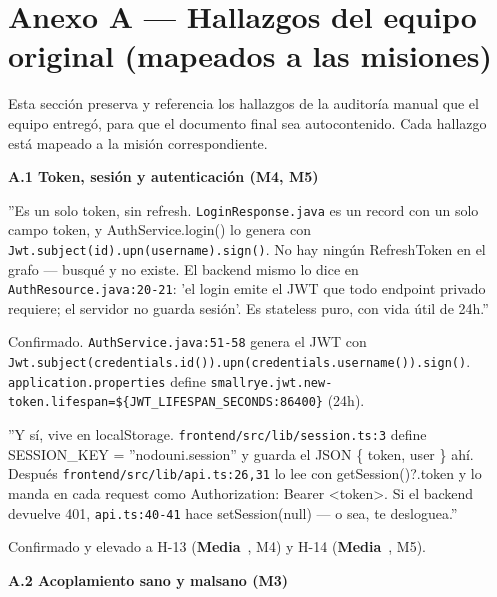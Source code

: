 \documentclass[10pt,a4paper]{article}
\newcommand{\code}[1]{\nolinkurl{#1}}
\newcommand{\badgeMedia}{\colorbox{yellow!35}{\textcolor{brown!90!black}{\textbf{\footnotesize Media}}}}
\begin{document}
\section*{Anexo A --- Hallazgos del equipo original (mapeados a las misiones)}
Esta sección preserva y referencia los hallazgos de la auditoría manual que el equipo entregó, para que el documento final sea autocontenido. Cada hallazgo está mapeado a la misión correspondiente.\par\vspace{0.4em}
\vspace{0.6em}\noindent\textbf{\normalsize A.1 Token, sesión y autenticación (M4, M5)}\par\vspace{0.2em}
''Es un solo token, sin refresh. \code{LoginResponse.java} es un record con un solo campo token, y AuthService.login() lo genera con \code{Jwt.subject(id).upn(username).sign()}. No hay ningún RefreshToken en el grafo --- busqué y no existe. El backend mismo lo dice en \code{AuthResource.java:20-21}: 'el login emite el JWT que todo endpoint privado requiere; el servidor no guarda sesión'. Es stateless puro, con vida útil de 24h.''\par\vspace{0.4em}
Confirmado. \code{AuthService.java:51-58} genera el JWT con \code{Jwt.subject(credentials.id()).upn(credentials.username()).sign()}. \code{application.properties} define \texttt{smallrye.jwt.}\allowbreak\texttt{new-token.lifespan=}\allowbreak\texttt{\$\{JWT\_LIFESPAN\_SECONDS:86400\}} (24h).\par\vspace{0.4em}
''Y sí, vive en localStorage. \code{frontend/src/lib/session.ts:3} define SESSION\_KEY = ''nodouni.session'' y guarda el JSON \{ token, user \} ahí. Después \code{frontend/src/lib/api.ts:26,31} lo lee con getSession()?.token y lo manda en cada request como Authorization: Bearer <token>. Si el backend devuelve 401, \code{api.ts:40-41} hace setSession(null) --- o sea, te desloguea.''\par\vspace{0.4em}
Confirmado y elevado a H-13 (\badgeMedia\ , M4) y H-14 (\badgeMedia\ , M5).\par\vspace{0.4em}
\vspace{0.6em}\noindent\textbf{\normalsize A.2 Acoplamiento sano y malsano (M3)}\par\vspace{0.2em}
\end{document}
